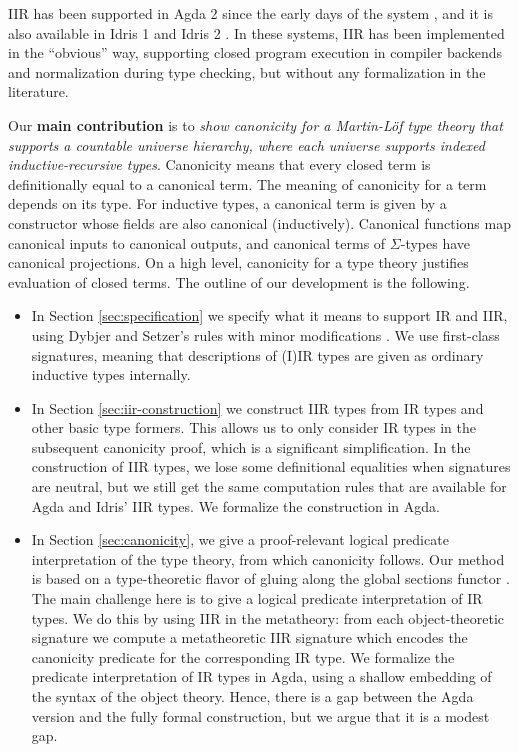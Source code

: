 \documentclass[acmsmall,screen,review,anonymous]{acmart}
\begin{document}
IIR has been supported in Agda 2 since the early days of the system \cite{DBLP:conf/tphol/BoveDN09},
and it is also available in Idris 1 \cite{DBLP:journals/jfp/Brady13} and Idris 2
\cite{DBLP:conf/ecoop/Brady21}. In these systems, IIR has been implemented in the ``obvious'' way,
supporting closed program execution in compiler backends and normalization during type checking, but
without any formalization in the literature.

Our \textbf{main contribution} is to \emph{show canonicity for a Martin-Löf type theory that
supports a countable universe hierarchy, where each universe supports indexed inductive-recursive
types}. Canonicity means that every closed term is definitionally equal to a canonical term. The
meaning of canonicity for a term depends on its type. For inductive types, a canonical term is given
by a constructor whose fields are also canonical (inductively). Canonical functions map canonical
inputs to canonical outputs, and canonical terms of $\Sigma$-types have canonical projections. On a
high level, canonicity for a type theory justifies evaluation of closed terms. The outline of our
development is the following.

\begin{itemize}
\item In Section \ref{sec:specification} we specify what it means to support IR and IIR, using
  Dybjer and Setzer's rules with minor modifications \cite{DBLP:journals/jlp/DybjerS06,DBLP:journals/apal/DybjerS03}. We use
  first-class signatures, meaning that descriptions of (I)IR types are given as ordinary inductive
  types internally.
\item In Section \ref{sec:iir-construction} we construct IIR types from IR types and other basic
  type formers. This allows us to only consider IR types in the subsequent canonicity proof, which
  is a significant simplification. In the construction of IIR types, we lose some definitional
  equalities when signatures are neutral, but we still get the same computation rules that are
  available for Agda and Idris' IIR types. We formalize the construction in Agda.
\item In Section \ref{sec:canonicity}, we give a proof-relevant logical predicate interpretation of
  the type theory, from which canonicity follows. Our method is based on a type-theoretic flavor of
  gluing along the global sections functor \cite{gluing,coquand2018canonicity}. The main challenge
  here is to give a logical predicate interpretation of IR types. We do this by using IIR in the
  metatheory: from each object-theoretic signature we compute a metatheoretic IIR signature which
  encodes the canonicity predicate for the corresponding IR type.  We formalize the predicate
  interpretation of IR types in Agda, using a shallow embedding of the syntax of the object
  theory. Hence, there is a gap between the Agda version and the fully formal construction, but we
  argue that it is a modest gap.
\end{itemize}
\end{document}
